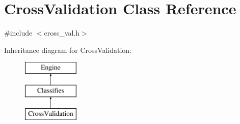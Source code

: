 \hypertarget{classCrossValidation}{
\section{CrossValidation Class Reference}
\label{classCrossValidation}
}


{\ttfamily \#include $<$cross\_\-val.h$>$}

Inheritance diagram for CrossValidation:\begin{figure}[H]
\begin{center}
\leavevmode
\includegraphics[height=3cm]{classCrossValidation}
\end{center}
\end{figure}

